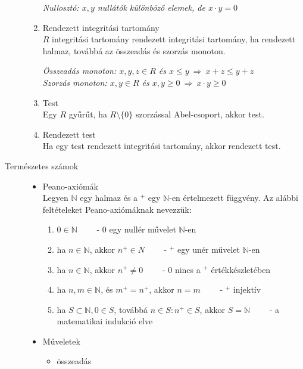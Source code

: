 \documentclass[margin=0px]{article}
\newcommand{\N}{\mathbb{N}}
\begin{document}
\begin{description}
\begin{enumerate}
                  \textit{Nullosztó: $x,y$ nullátók különböző elemek, de $x\cdot y = 0$}
            \item Rendezett integritási tartomány \\
                  $R$ integritási tartomány rendezett integritási tartomány, ha rendezett halmaz, továbbá az összeadás és szorzás monoton.

                  \textit{Összeadás monoton: $x,y,z \in R$ és $x \leq y \ \Rightarrow \ x+z \leq y+z$ \\
                      Szorzás monoton: $x,y \in R$ és $x,y\geq0 \ \Rightarrow \ x\cdot y \geq 0$ }
            \item Test \\
                  Egy $R$ gyűrűt, ha $R\setminus\{0\}$ szorzással Abel-csoport, akkor test.
            \item Rendezett test \\
                  Ha egy test rendezett integritási tartomány, akkor rendezett test.
        \end{enumerate}
        \item[Természetes számok]\hfill
        \begin{itemize}
            \item Peano-axiómák \\
                  Legyen $\N$ egy halmaz és a $^+$ egy $\N$-en értelmezett függvény. Az alábbi feltételeket Peano-axiómáknak nevezzük:
                  \begin{enumerate}
                      \item $0 \in \N \qquad$ - $0$ egy nullér művelet $\N$-en
                      \item ha $n \in \N$, akkor $n^+ \in N \qquad$ - $^+$ egy unér művelet $\N$-en
                      \item ha $n \in \N$, akkor $n^+ \neq 0 \qquad $ - $0$ nincs a $^+$ értékkészletében
                      \item ha $n,m \in \N$, és $m^+ = n^+$, akkor $n = m \qquad $ - $^+$ injektív
                      \item ha $S \subset \N, 0 \in S$, továbbá $ n \in S : n^+\in S$, akkor $S = \N \qquad $ - a matematikai indukció elve
                  \end{enumerate}
            \item Műveletek
                  \begin{itemize}
                      \item összeadás \\

\end{itemize}
\end{itemize}
\end{description}
\end{document}
